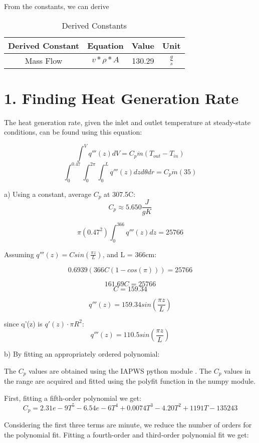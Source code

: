 \documentclass[12pt,letterpaper]{article}
\begin{document}
From the constants, we can derive
\begin{table}[h]
     \centering
    \begin{tabular}{cccc}
    \hline
       Derived Constant & Equation & Value & Unit \\
    \hline
       Mass Flow & $ v * \rho * A $ & 130.29 & $\frac{g}{s}$ \\
    \hline
    \end{tabular}
    \caption {Derived Constants}
    \label{tab:der_constants}
\end{table}



\section* {1. Finding Heat Generation Rate}

The heat generation rate, given the inlet and outlet temperature
at steady-state conditions, can be found using this equation:

\[\int^{V} q'''(z) dV = C_p \dot{m} (T_{out} - T_{in})\]
\[\int^{0.47}_{0} \int^{2\pi}_{0} \int^{L}_{0} q'''(z) dz d\theta dr= C_p \dot{m} (35)\]

a) Using a constant, average $C_p$ at 307.5C:
\[C_p \approx 5.650 \frac{J}{g K}\]

\[ \pi (0.47^2)  \int^{366}_{0} q'''(z) dz = 25766\]

Assuming $q'''(z) = C sin(\frac{\pi z}{L})$,
and L = 366cm:

\[ 0.6939 (366C(1-cos(\pi))) = 25766\]

\[161.69C = 25766\]
\[C = 159.34 \]

\[q'''(z) = 159.34 sin(\frac{\pi z}{L})\]

since q'(z) is $q'(z) \cdot \pi R^2$:
\[q'''(z) = 110.5 sin(\frac{\pi z}{L})\]

b) By fitting an appropriately ordered polynomial:

The $C_p$ values are obtained using the IAPWS python
module \cite{romera_iapws_2017}. The $C_p$ values
in the range are acquired and fitted using
the polyfit function in the numpy module.

First, fitting a fifth-order polynomial we get:
\[C_p = 2.31e-9 T^5 -6.54e-6 T^4 +0.0074 T^3 -4.20 T^2 +1191T -135243\]

Considering the first three terms are minute, we reduce the 
number of orders for the polynomial fit. Fitting a fourth-order and 
third-order polynomial fit we get:
\end{document}
